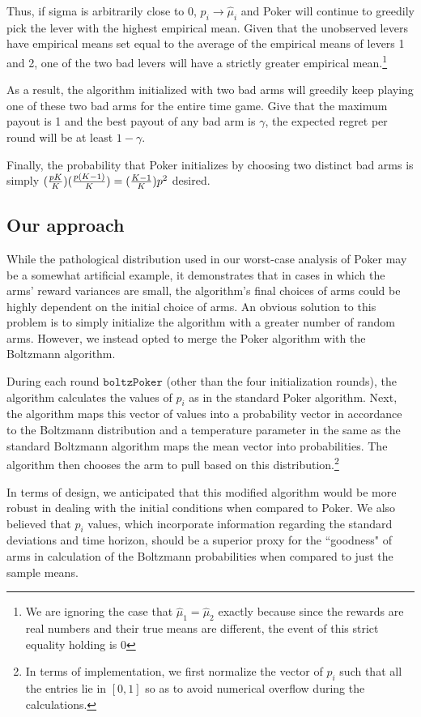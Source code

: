 \documentclass[12pt]{article}
\begin{document}
Thus, if sigma is arbitrarily close to $0$, $p_{i} \rightarrow \hat{\mu}_{i}$ and Poker will continue to greedily pick the lever with the highest empirical mean. Given that the unobserved levers have empirical means set equal to the average of the empirical means of levers 1 and 2, one of the two bad levers will have a strictly greater empirical mean.\footnote{We are ignoring the case that $\hat{\mu}_{1} = \hat{\mu}_{2}$ exactly because since the rewards are real numbers and their true means are different, the event of this strict equality holding is 0}

As a result, the algorithm initialized with two bad arms will greedily keep playing one of these two bad arms for the entire time game. Give that the maximum payout is 1 and the best payout of any bad arm is $\gamma$, the expected regret per round will be at least $1-\gamma$. 

Finally, the probability that Poker initializes by choosing two distinct bad arms is simply $({pK\over{K}})({p(K-1)\over{K}}) = ({K-1\over K})p^{2}$ desired.

\subsection{Our approach}

While the pathological distribution used in our worst-case analysis of Poker may be a somewhat artificial example, it demonstrates that in cases in which the arms' reward variances are small, the algorithm's final choices of arms could be highly dependent  on the initial choice of arms. An obvious solution to this problem is to simply initialize the algorithm with a greater number of random arms. However, we instead opted to merge the Poker algorithm with the Boltzmann algorithm.

During each round $\texttt{boltzPoker}$ (other than the four initialization rounds), the algorithm calculates the values of $p_{i}$ as in the standard Poker algorithm. Next, the algorithm maps this vector of values into a probability vector in accordance to the Boltzmann distribution and a temperature parameter in the same as the standard Boltzmann algorithm maps the mean vector into probabilities. The algorithm then chooses the arm to pull based on this distribution.\footnote{In terms of implementation, we first normalize the vector of $p_{i}$ such that all the entries lie in $[0,1]$ so as to avoid numerical overflow during the calculations.}

In terms of design, we anticipated that this modified algorithm would be more robust in dealing with the initial conditions when compared to Poker. We also believed that $p_{i}$ values, which incorporate information regarding the standard deviations and time horizon, should be a superior proxy for the ``goodness" of arms in calculation of the Boltzmann probabilities when compared to just the sample means.
\end{document}
